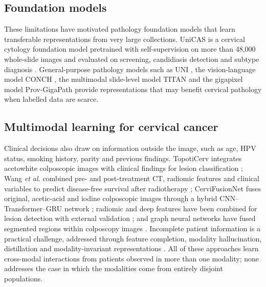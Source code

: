 \documentclass[lettersize,journal]{IEEEtran}
\begin{document}
\subsection{Foundation models}
These limitations have motivated pathology foundation models that learn transferable representations from very large collections. UniCAS is a cervical cytology foundation model pretrained with self-supervision on more than 48,000 whole-slide images and evaluated on screening, candidiasis detection and subtype diagnosis \cite{jiang2026unicas}. General-purpose pathology models such as UNI \cite{chen2024uni}, the vision-language model CONCH \cite{lu2024visual}, the multimodal slide-level model TITAN \cite{ding2025titan} and the gigapixel model Prov-GigaPath \cite{xu2024provgigapath} provide representations that may benefit cervical pathology when labelled data are scarce.

\subsection{Multimodal learning for cervical cancer}
Clinical decisions also draw on information outside the image, such as age, HPV status, smoking history, parity and previous findings. TopotiCerv integrates acetowhite colposcopic images with clinical findings for lesion classification \cite{das2026topoticerv}; Wang \emph{et al.} combined pre- and post-treatment CT, radiomic features and clinical variables to predict disease-free survival after radiotherapy \cite{wang2025cervipro}; CerviFusionNet fuses original, acetic-acid and iodine colposcopic images through a hybrid CNN--Transformer--GRU network \cite{sha2024cervifusionnet}; radiomic and deep features have been combined for lesion detection with external validation \cite{niu2025hybridfeatu}; and graph neural networks have fused segmented regions within colposcopy images \cite{chatterjee2025multi}. Incomplete patient information is a practical challenge, addressed through feature completion, modality hallucination, distillation and modality-invariant representations \cite{wu2026deep,havaei2016hemis,yao2024drfuse}. All of these approaches learn cross-modal interactions from patients observed in more than one modality; none addresses the case in which the modalities come from entirely disjoint populations.
\end{document}
